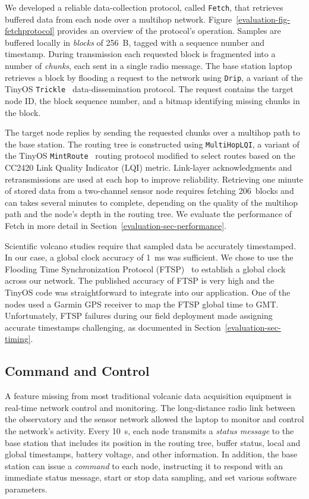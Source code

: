 We developed a reliable data-collection protocol, called \texttt{Fetch}, that
retrieves buffered data from each node over a multihop network.
Figure~\ref{evaluation-fig-fetchprotocol} provides an overview of the
protocol's operation. Samples are buffered locally in \textit{blocks} of
256~B, tagged with a sequence number and timestamp. During transmission each
requested block is fragmented into a number of \textit{chunks}, each sent in
a single radio message. The base station laptop retrieves a block by flooding
a request to the network using \texttt{Drip}, a variant of the TinyOS
\texttt{Trickle}~\cite{trickle} data-dissemination protocol. The request
contains the target node ID, the block sequence number, and a bitmap
identifying missing chunks in the block.

The target node replies by sending the requested chunks over a multihop path
to the base station. The routing tree is constructed using
\texttt{MultiHopLQI}, a variant of the TinyOS
\texttt{MintRoute}~\cite{awoo-multihop} routing protocol modified to select
routes based on the CC2420 Link Quality Indicator (LQI) metric. Link-layer
acknowledgments and retransmissions are used at each hop to improve
reliability. Retrieving one minute of stored data from a two-channel sensor
node requires fetching 206~blocks and can takes several minutes to complete,
depending on the quality of the multihop path and the node's depth in the
routing tree. We evaluate the performance of Fetch in more detail in
Section~\ref{evaluation-sec-performance}.

Scientific volcano studies require that sampled data be accurately
timestamped. In our case, a global clock accuracy of 1~ms was sufficient. We
chose to use the Flooding Time Synchronization Protocol (FTSP)~\cite{ftsp} to
establish a global clock across our network. The published accuracy of FTSP
is very high and the TinyOS code was straightforward to integrate into our
application. One of the nodes used a Garmin GPS receiver to map the FTSP
global time to GMT. Unfortunately, FTSP failures during our field deployment
made assigning accurate timestamps challenging, as documented in
Section~\ref{evaluation-sec-timing}.

\subsection{Command and Control}

A feature missing from most traditional volcanic data acquisition equipment
is real-time network control and monitoring. The long-distance radio link
between the observatory and the sensor network allowed the laptop to monitor
and control the network's activity. Every 10~s, each node transmits a
\textit{status message} to the base station that includes its position in the
routing tree, buffer status, local and global timestamps, battery voltage,
and other information. In addition, the base station can issue a
\textit{command} to each node, instructing it to respond with an immediate
status message, start or stop data sampling, and set various software
parameters.

